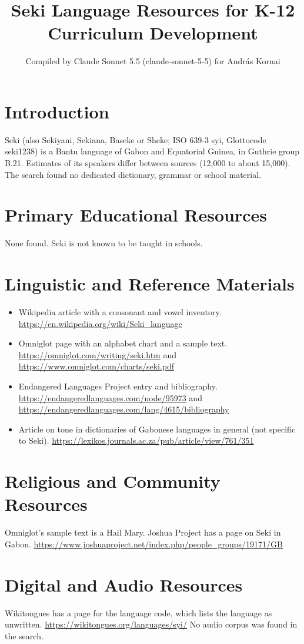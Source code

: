 \documentclass[12pt]{article}
\title{Seki Language Resources for K-12 Curriculum Development}
\author{Compiled by Claude Sonnet 5.5 (claude-sonnet-5-5) for Andr\'as Kornai}
\date{}
\begin{document}
\maketitle

\section{Introduction}
Seki (also Sekiyani, Sekiana, Baseke or Sheke; ISO 639-3 syi, Glottocode seki1238) is a Bantu language of Gabon and Equatorial Guinea, in Guthrie group B.21. Estimates of its speakers differ between sources (12,000 to about 15,000). The search found no dedicated dictionary, grammar or school material.

\section{Primary Educational Resources}
None found. Seki is not known to be taught in schools.

\section{Linguistic and Reference Materials}
\begin{itemize}
\item Wikipedia article with a consonant and vowel inventory. \url{https://en.wikipedia.org/wiki/Seki_language}
\item Omniglot page with an alphabet chart and a sample text. \url{https://omniglot.com/writing/seki.htm} and \url{https://www.omniglot.com/charts/seki.pdf}
\item Endangered Languages Project entry and bibliography. \url{https://endangeredlanguages.com/node/95973} and \url{https://endangeredlanguages.com/lang/4615/bibliography}
\item Article on tone in dictionaries of Gabonese languages in general (not specific to Seki). \url{https://lexikos.journals.ac.za/pub/article/view/761/351}
\end{itemize}

\section{Religious and Community Resources}
Omniglot's sample text is a Hail Mary. Joshua Project has a page on Seki in Gabon. \url{https://www.joshuaproject.net/index.php/people_groups/19171/GB}

\section{Digital and Audio Resources}
Wikitongues has a page for the language code, which lists the language as unwritten. \url{https://wikitongues.org/languages/syi/} No audio corpus was found in the search.
\end{document}
